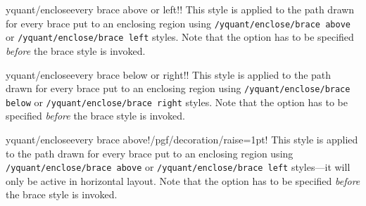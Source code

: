 \documentclass{scrartcl}
\makeatletter
\let\unpatched@minted@inline@iii=\minted@inline@iii%
\def\patched@minted@inline@iii#1{%
      \unpatched@minted@inline@iii{#1}%
      \par%
      \endgroup\egroup\nopagebreak\vskip-\parskip\nopagebreak%
      \noindent\ignorespaces%
   }
\def\patch@mintinline{%
      \let\minted@inline@iii=\patched@minted@inline@iii%
   }
\let\unpatched@RobustMintInlineProcess@ii=\RobustMintInlineProcess@ii
\def\patched@RobustMintInlineProcess@ii#1{%
      \unpatched@RobustMintInlineProcess@ii{#1}%
      \par%
      \endgroup\egroup\nopagebreak\vskip-\parskip\nopagebreak%
      \noindent\ignorespaces%
   }
\def\patch@mintinline{%
      \let\RobustMintInlineProcess@ii=\patched@RobustMintInlineProcess@ii%
   }
\newenvironment{option*}[3][]{\ifhmode\par\fi\addvspace{5mm}%
   \vbox\bgroup\begingroup%
      \patch@mintinline%
      \raggedleft%
      \hspace*{-1cm}%
      \phantomsection\label{yquant:/#2/#3}%
      \texttt{\ifstrempty{#1}\relax{\compat{#1}}\textcolor{gray}{/#2/}\textcolor{mintgreen}{#3}}\hfill default: %
      \tex}{\par\addvspace{5mm}}
\def\ttlink{\link\texttt}
\makeatother
\begin{document}

               \begin{option*}{yquant/enclose}{every brace above or left}!!
                  This style is applied to the path drawn for every brace put to an enclosing region using \ttlink{/yquant/enclose/brace above} or \ttlink{/yquant/enclose/brace left} styles.
                  Note that the option has to be specified \emph{before} the brace style is invoked.
               \end{option*}


               \begin{option*}{yquant/enclose}{every brace below or right}!!
                  This style is applied to the path drawn for every brace put to an enclosing region using \ttlink{/yquant/enclose/brace below} or \ttlink{/yquant/enclose/brace right} styles.
                  Note that the option has to be specified \emph{before} the brace style is invoked.
               \end{option*}


               \begin{option*}{yquant/enclose}{every brace above}!/pgf/decoration/raise=1pt!
                  This style is applied to the path drawn for every brace put to an enclosing region using \ttlink{/yquant/enclose/brace above} or \ttlink{/yquant/enclose/brace left} styles---it will only be active in horizontal layout.
                  Note that the option has to be specified \emph{before} the brace style is invoked.
               \end{option*}
\end{document}
